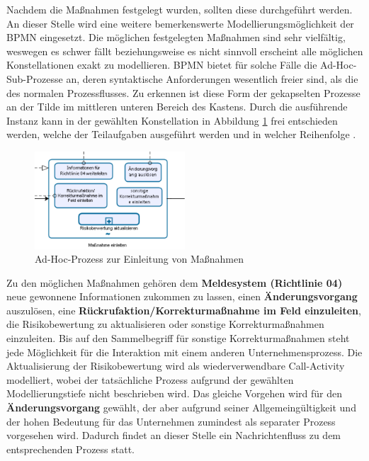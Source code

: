 \documentclass[a4paper,12pt]{report}
\begin{document}
Nachdem die Maßnahmen festgelegt wurden, sollten diese durchgeführt werden. An dieser Stelle wird eine weitere bemerkenswerte Modellierungsmöglichkeit der BPMN eingesetzt. Die möglichen festgelegten Maßnahmen sind sehr vielfältig, weswegen es schwer fällt beziehungsweise es nicht sinnvoll erscheint alle möglichen Konstellationen exakt zu modellieren. BPMN bietet für solche Fälle die Ad-Hoc-Sub-Prozesse an, deren syntaktische Anforderungen wesentlich freier sind, als die des normalen Prozessflusses. Zu erkennen ist diese Form der gekapselten Prozesse an der Tilde im mittleren unteren Bereich des Kastens. Durch die ausführende Instanz kann in der gewählten Konstellation in Abbildung \ref{ad_hoc_process} frei entschieden werden, welche der Teilaufgaben ausgeführt werden und in welcher Reihenfolge \citep[vgl.][S. 180]{OMG2011} \citep[vgl.][S. 431]{OMG2011}. 
\begin{figure}[ht]
\centering
\includegraphics[width=0.5\textwidth]{Images/ad_hoc_process}
\caption[Ad-Hoc-Prozess zur Einleitung von Maßnahmen]{Ad-Hoc-Prozess zur Einleitung von Maßnahmen}
\label{ad_hoc_process}
\end{figure}
Zu den möglichen Maßnahmen gehören dem \textbf{Meldesystem (Richtlinie 04)} neue gewonnene Informationen zukommen zu lassen, einen \textbf{Änderungsvorgang} auszulösen, eine \textbf{Rückrufaktion/Korrekturmaßnahme im Feld einzuleiten}, die Risikobewertung zu aktualisieren oder sonstige Korrekturmaßnahmen einzuleiten. Bis auf den Sammelbegriff für sonstige Korrekturmaßnahmen steht jede Möglichkeit für die Interaktion mit einem anderen Unternehmensprozess. Die Aktualisierung der Risikobewertung wird als wiederverwendbare Call-Activity modelliert, wobei der tatsächliche Prozess aufgrund der gewählten Modellierungstiefe nicht beschrieben wird. Das gleiche Vorgehen wird für den \textbf{Änderungsvorgang} gewählt, der aber aufgrund seiner Allgemeingültigkeit und der hohen Bedeutung für das Unternehmen zumindest als separater Prozess vorgesehen wird. Dadurch findet an dieser Stelle ein Nachrichtenfluss zu dem entsprechenden Prozess statt.
\end{document}
